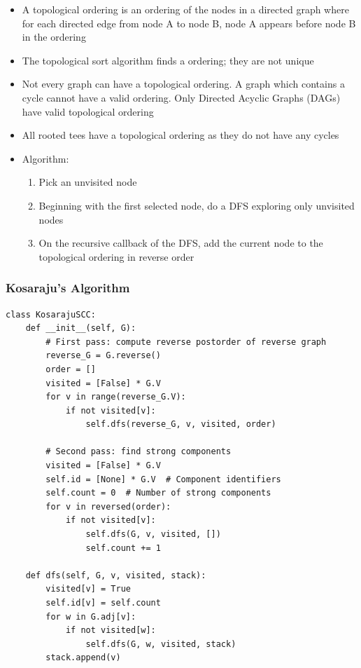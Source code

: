 \documentclass{article}
\begin{document}
\begin{itemize}
    \item A topological ordering is an ordering of the nodes in a directed graph where for each directed edge from node A to node B, node A appears before node B in the ordering
    \item The topological sort algorithm finds a ordering; they are not unique
    \item Not every graph can have a topological ordering. A graph which contains a cycle cannot have a valid ordering. Only Directed Acyclic Graphs (DAGs) have valid topological ordering
    \item All rooted tees have a topological ordering as they do not have any cycles
    \item Algorithm:
    \begin{enumerate}
        \item Pick an unvisited node
        \item Beginning with the first selected node, do a DFS exploring only unvisited nodes
        \item On the recursive callback of the DFS, add the current node to the topological ordering in reverse order
    \end{enumerate}
\end{itemize}

\subsubsection{Kosaraju's Algorithm}

\begin{verbatim}
class KosarajuSCC:
    def __init__(self, G):
        # First pass: compute reverse postorder of reverse graph
        reverse_G = G.reverse()
        order = []
        visited = [False] * G.V
        for v in range(reverse_G.V):
            if not visited[v]:
                self.dfs(reverse_G, v, visited, order)
        
        # Second pass: find strong components
        visited = [False] * G.V
        self.id = [None] * G.V  # Component identifiers
        self.count = 0  # Number of strong components
        for v in reversed(order):
            if not visited[v]:
                self.dfs(G, v, visited, [])
                self.count += 1

    def dfs(self, G, v, visited, stack):
        visited[v] = True
        self.id[v] = self.count
        for w in G.adj[v]:
            if not visited[w]:
                self.dfs(G, w, visited, stack)
        stack.append(v)
\end{verbatim}
\end{document}
